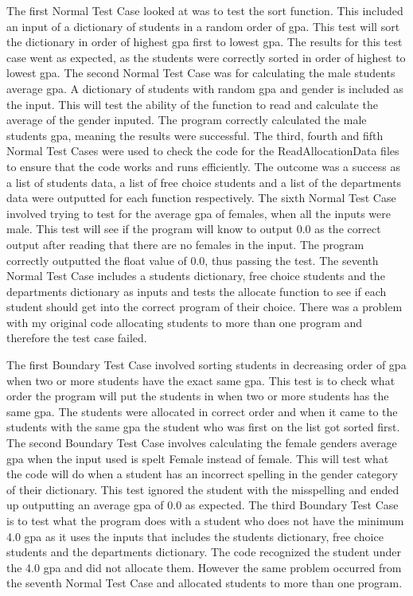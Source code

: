 \documentclass[12pt]{article}
\begin{document}
The first Normal Test Case looked at was to test the sort function. This included an input of a dictionary of students in a random order of gpa. This test will sort the dictionary in order of highest gpa first to lowest gpa. The results for this test case went as expected, as the students were correctly sorted in order of highest to lowest gpa.
The second Normal Test Case was for calculating the male students average gpa. A dictionary of students with random gpa and gender is included as the input. This will test the ability of the function to read and calculate the average of the gender inputed. The program correctly calculated the male students gpa, meaning the results were successful.
The third, fourth and fifth Normal Test Cases were used to check the code for the ReadAllocationData files to ensure that the code works and runs efficiently. The outcome was a success as a list of students data, a list of free choice students and a list of the departments data were outputted for each function respectively.
The sixth Normal Test Case involved trying to test for the average gpa of females, when all the inputs were male. This test will see if the program will know to output 0.0 as the correct output after reading that there are no females in the input. The program correctly outputted the float value of 0.0, thus passing the test.
The seventh Normal Test Case includes a students dictionary, free choice students and the departments dictionary as inputs and tests the allocate function to see if each student should get into the correct program of their choice. There was a problem with my original code allocating students to more than one program and therefore the test case failed.
\newline

The first Boundary Test Case involved sorting students in decreasing order of gpa when two or more students have the exact same gpa. This test is to check what order the program will put the students in when two or more students has the same gpa. The students were allocated in correct order and when it came to the students with the same gpa the student who was first on the list got sorted first.
The second Boundary Test Case involves calculating the female genders average gpa when the input used is spelt Female instead of female. This will test what the code will do when a student has an incorrect spelling in the gender category of their dictionary. This test ignored the student with the misspelling and ended up outputting an average gpa of 0.0 as expected.
The third Boundary Test Case is to test what the program does with a student who does not have the minimum 4.0 gpa as it uses the inputs that includes the students dictionary, free choice students and the departments dictionary. The code recognized the student under the 4.0 gpa and did not allocate them. However the same problem occurred from the seventh Normal Test Case and allocated students to more than one program.
\newline
\end{document}
